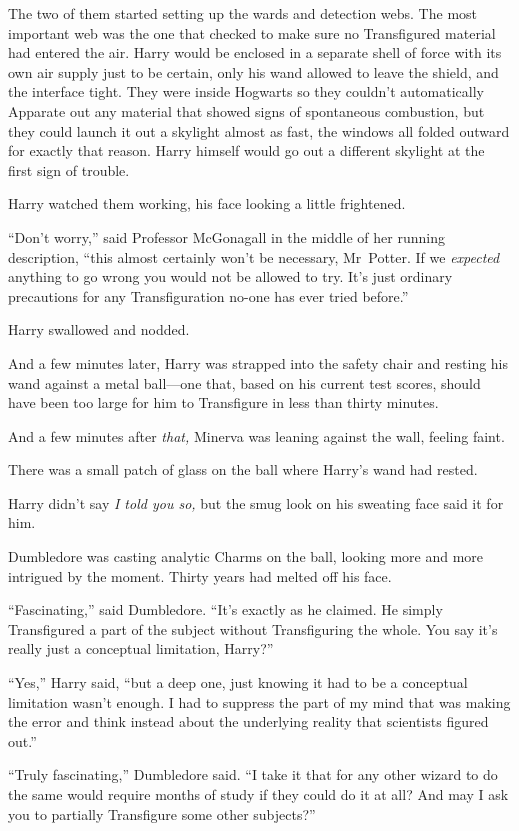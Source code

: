 The two of them started setting up the wards and detection webs. The most important web was the one that checked to make sure no Transfigured material had entered the air. Harry would be enclosed in a separate shell of force with its own air supply just to be certain, only his wand allowed to leave the shield, and the interface tight. They were inside Hogwarts so they couldn’t automatically Apparate out any material that showed signs of spontaneous combustion, but they could launch it out a skylight almost as fast, the windows all folded outward for exactly that reason. Harry himself would go out a different skylight at the first sign of trouble.

Harry watched them working, his face looking a little frightened.

“Don’t worry,” said Professor McGonagall in the middle of her running description, “this almost certainly won’t be necessary, Mr~Potter. If we \emph{expected} anything to go wrong you would not be allowed to try. It’s just ordinary precautions for any Transfiguration no-one has ever tried before.”

Harry swallowed and nodded.

And a few minutes later, Harry was strapped into the safety chair and resting his wand against a metal ball—one that, based on his current test scores, should have been too large for him to Transfigure in less than thirty minutes.

And a few minutes after \emph{that,} Minerva was leaning against the wall, feeling faint.

There was a small patch of glass on the ball where Harry’s wand had rested.

Harry didn’t say \emph{I told you so,} but the smug look on his sweating face said it for him.

Dumbledore was casting analytic Charms on the ball, looking more and more intrigued by the moment. Thirty years had melted off his face.

“Fascinating,” said Dumbledore. “It’s exactly as he claimed. He simply Transfigured a part of the subject without Transfiguring the whole. You say it’s really just a conceptual limitation, Harry?”

“Yes,” Harry said, “but a deep one, just knowing it had to be a conceptual limitation wasn’t enough. I had to suppress the part of my mind that was making the error and think instead about the underlying reality that scientists figured out.”

“Truly fascinating,” Dumbledore said. “I take it that for any other wizard to do the same would require months of study if they could do it at all? And may I ask you to partially Transfigure some other subjects?”

